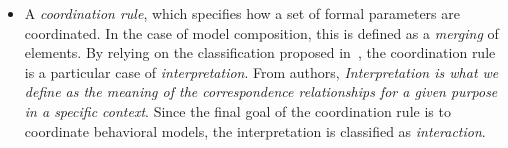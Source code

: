 \begin{itemize}
		\item A \emph{coordination rule}, which specifies how a set of formal parameters are coordinated. In the case of model composition, this is defined as a \emph{merging} of elements. By relying on the classification proposed in~\cite{clavreulmodelcompo}, the coordination rule is a particular case of \emph{interpretation}. From authors, \emph{Interpretation is what we define as the meaning of the correspondence relationships for a given purpose in a specific context}. Since the final goal of the coordination rule is to coordinate behavioral models, the interpretation is classified as \emph{interaction}.  
 
\end{itemize}
